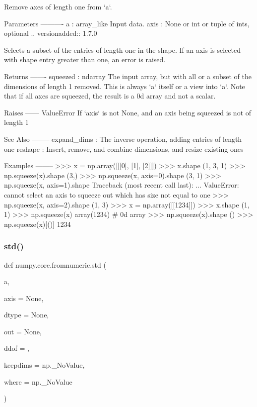 \begin{DoxyVerb}Remove axes of length one from `a`.

Parameters
----------
a : array_like
    Input data.
axis : None or int or tuple of ints, optional
    .. versionadded:: 1.7.0

    Selects a subset of the entries of length one in the
    shape. If an axis is selected with shape entry greater than
    one, an error is raised.

Returns
-------
squeezed : ndarray
    The input array, but with all or a subset of the
    dimensions of length 1 removed. This is always `a` itself
    or a view into `a`. Note that if all axes are squeezed,
    the result is a 0d array and not a scalar.

Raises
------
ValueError
    If `axis` is not None, and an axis being squeezed is not of length 1

See Also
--------
expand_dims : The inverse operation, adding entries of length one
reshape : Insert, remove, and combine dimensions, and resize existing ones

Examples
--------
>>> x = np.array([[[0], [1], [2]]])
>>> x.shape
(1, 3, 1)
>>> np.squeeze(x).shape
(3,)
>>> np.squeeze(x, axis=0).shape
(3, 1)
>>> np.squeeze(x, axis=1).shape
Traceback (most recent call last):
...
ValueError: cannot select an axis to squeeze out which has size not equal to one
>>> np.squeeze(x, axis=2).shape
(1, 3)
>>> x = np.array([[1234]])
>>> x.shape
(1, 1)
>>> np.squeeze(x)
array(1234)  # 0d array
>>> np.squeeze(x).shape
()
>>> np.squeeze(x)[()]
1234\end{DoxyVerb}
 \mbox{\label{namespacenumpy_1_1core_1_1fromnumeric_adffa060dbb751a83ab96352b457ea951}} 
\subsubsection{\texorpdfstring{std()}{std()}}
{\footnotesize\ttfamily def numpy.\+core.\+fromnumeric.\+std (\begin{DoxyParamCaption}\item[{}]{a,  }\item[{}]{axis = {\ttfamily None},  }\item[{}]{dtype = {\ttfamily None},  }\item[{}]{out = {\ttfamily None},  }\item[{}]{ddof = {},  }\item[{}]{keepdims = {\ttfamily np.\+\_\+NoValue},  }\item[{}]{where = {\ttfamily np.\+\_\+NoValue} }\end{DoxyParamCaption})}

